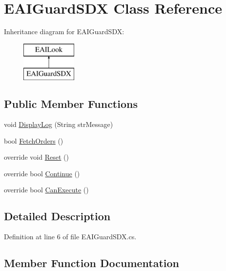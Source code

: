 \hypertarget{class_e_a_i_guard_s_d_x}{}\section{E\+A\+I\+Guard\+S\+DX Class Reference}
\label{class_e_a_i_guard_s_d_x}
Inheritance diagram for E\+A\+I\+Guard\+S\+DX\+:\begin{figure}[H]
\begin{center}
\leavevmode
\includegraphics[height=2.000000cm]{d1/dd8/class_e_a_i_guard_s_d_x}
\end{center}
\end{figure}
\subsection*{Public Member Functions}
\begin{DoxyCompactItemize}
\item 
void \mbox{\hyperlink{class_e_a_i_guard_s_d_x_ac0341198cb9c52a5426046c398db7105}{Display\+Log}} (String str\+Message)
\item 
bool \mbox{\hyperlink{class_e_a_i_guard_s_d_x_af2404340be7f99173c0f5cdbb4ee2fcc}{Fetch\+Orders}} ()
\item 
override void \mbox{\hyperlink{class_e_a_i_guard_s_d_x_a2f74924f511b3891410c7faaec7b852b}{Reset}} ()
\item 
override bool \mbox{\hyperlink{class_e_a_i_guard_s_d_x_afd38634fac3d0e5904071101bd261b32}{Continue}} ()
\item 
override bool \mbox{\hyperlink{class_e_a_i_guard_s_d_x_a26047aaea537260cd1b3a671ceb8ba41}{Can\+Execute}} ()
\end{DoxyCompactItemize}


\subsection{Detailed Description}


Definition at line 6 of file E\+A\+I\+Guard\+S\+D\+X.\+cs.



\subsection{Member Function Documentation}
\mbox{\label{class_e_a_i_guard_s_d_x_a26047aaea537260cd1b3a671ceb8ba41}} 
